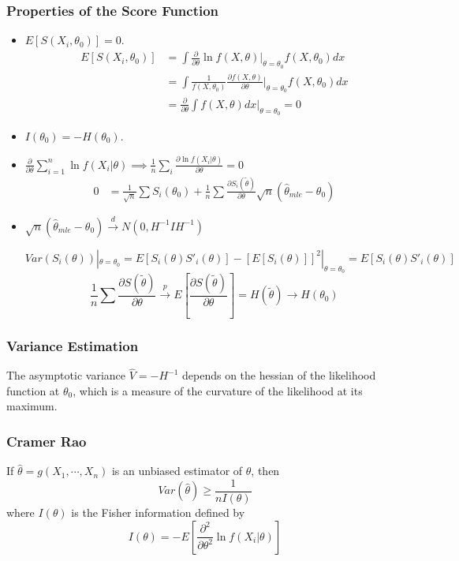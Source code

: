 \documentclass[11pt, a4paper, oneside]{article}
\theoremstyle{definition}
\theoremstyle{proposition}
\theoremstyle{corollary}
\theoremstyle{lemma}
\theoremstyle{theorem}
\begin{document}
\subsubsection{Properties of the Score Function}
\begin{itemize}
\item $E[S(X_i, \theta_0)] = 0$. 
\begin{align*}
E[S(X_i, \theta_0)]  &= \int\frac{\partial}{\partial \theta}\ln{f(X, \theta)|_{\theta=\theta_0}f(X, \theta_0)} dx \\
&=\int\frac{1}{f(X, \theta_0)} \frac{\partial f(X, \theta)}{\partial \theta}|_{\theta=\theta_0} f(X, \theta_0)  dx \\
&=\frac{\partial}{\partial \theta} \int f(X, \theta)dx|_{\theta= \theta_0} = 0
\end{align*}
\item $I(\theta_0) = -H(\theta_0)$. 
\item $\frac{\partial}{\partial \theta}\sum_{i=1}^n \ln{f(X_i|\theta)} \implies \frac{1}{n} \sum_i \frac{\partial \ln{f(X_i|\theta)}}{\partial \theta}= 0$
\begin{align*}
0 & = \frac{1}{\sqrt{n}}\sum S_i(\theta_0) +\frac{1}{n} \sum \frac{\partial S_i(\tilde{\theta})}{\partial \theta} \sqrt{n}(\hat{\theta}_{mle} - \theta_0)
\end{align*}
\item $\sqrt{n}(\hat{\theta}_{mle} - \theta_0) \overset{d}{\to} N(0, H^{-1}IH^{-1})$

$$Var(S_i(\theta))|_{\theta=\theta_0} = E[S_i(\theta)S'_i(\theta)] -[E[S_i(\theta)]]^2|_{\theta=\theta_0} = E[S_i(\theta)S'_i(\theta)]$$
$$\frac{1}{n}\sum \frac{\partial S(\tilde{\theta})}{\partial \theta} \overset{p}{\to} E[\frac{\partial S(\tilde{\theta})}{\partial \theta}] =H(\tilde{\theta}) \to H(\theta_0)$$
\end{itemize}

\subsubsection{Variance Estimation}
The asymptotic variance $\hat{V} = -H^{-1}$ depends on the hessian of the likelihood function at $\theta_0$, which is a measure of the curvature of the likelihood at its maximum. 

\subsubsection{Cramer Rao}
If $\hat{\theta} = g(X_1, \cdots, X_n)$ is an unbiased estimator of $\theta$, then $$Var(\hat{\theta}) \geq \frac{1}{n I(\theta)}$$
where $I(\theta)$ is the Fisher information defined by 
$$I(\theta) = -E[\frac{\partial^2}{\partial \theta^2}\ln{f(X_i|\theta)}]$$
\end{document}
